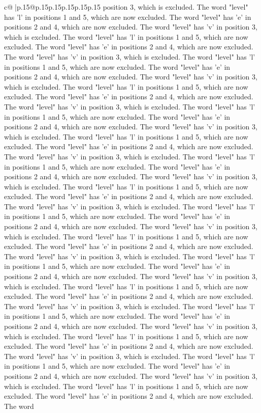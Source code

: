 \documentclass{article}
\begin{document}
{\begin{supertabular}{c@{$\;$}|p{.15\linewidth}@{}p{.15\linewidth}p{.15\linewidth}p{.15\linewidth}p{.15\linewidth}p{.15\linewidth}}
{{{position 3, which is excluded. The word "level" has 'l' in positions 1 and 5, which are now excluded. The word "level" has 'e' in positions 2 and 4, which are now excluded. The word "level" has 'v' in position 3, which is excluded. The word "level" has 'l' in positions 1 and 5, which are now excluded. The word "level" has 'e' in positions 2 and 4, which are now excluded. The word "level" has 'v' in position 3, which is excluded. The word "level" has 'l' in positions 1 and 5, which are now excluded. The word "level" has 'e' in positions 2 and 4, which are now excluded. The word "level" has 'v' in position 3, which is excluded. The word "level" has 'l' in positions 1 and 5, which are now excluded. The word "level" has 'e' in positions 2 and 4, which are now excluded. The word "level" has 'v' in position 3, which is excluded. The word "level" has 'l' in positions 1 and 5, which are now excluded. The word "level" has 'e' in positions 2 and 4, which are now excluded. The word "level" has 'v' in position 3, which is excluded. The word "level" has 'l' in positions 1 and 5, which are now excluded. The word "level" has 'e' in positions 2 and 4, which are now excluded. The word "level" has 'v' in position 3, which is excluded. The word "level" has 'l' in positions 1 and 5, which are now excluded. The word "level" has 'e' in positions 2 and 4, which are now excluded. The word "level" has 'v' in position 3, which is excluded. The word "level" has 'l' in positions 1 and 5, which are now excluded. The word "level" has 'e' in positions 2 and 4, which are now excluded. The word "level" has 'v' in position 3, which is excluded. The word "level" has 'l' in positions 1 and 5, which are now excluded. The word "level" has 'e' in positions 2 and 4, which are now excluded. The word "level" has 'v' in position 3, which is excluded. The word "level" has 'l' in positions 1 and 5, which are now excluded. The word "level" has 'e' in positions 2 and 4, which are now excluded. The word "level" has 'v' in position 3, which is excluded. The word "level" has 'l' in positions 1 and 5, which are now excluded. The word "level" has 'e' in positions 2 and 4, which are now excluded. The word "level" has 'v' in position 3, which is excluded. The word "level" has 'l' in positions 1 and 5, which are now excluded. The word "level" has 'e' in positions 2 and 4, which are now excluded. The word "level" has 'v' in position 3, which is excluded. The word "level" has 'l' in positions 1 and 5, which are now excluded. The word "level" has 'e' in positions 2 and 4, which are now excluded. The word "level" has 'v' in position 3, which is excluded. The word "level" has 'l' in positions 1 and 5, which are now excluded. The word "level" has 'e' in positions 2 and 4, which are now excluded. The word "level" has 'v' in position 3, which is excluded. The word "level" has 'l' in positions 1 and 5, which are now excluded. The word "level" has 'e' in positions 2 and 4, which are now excluded. The word "level" has 'v' in position 3, which is excluded. The word "level" has 'l' in positions 1 and 5, which are now excluded. The word "level" has 'e' in positions 2 and 4, which are now excluded. The word }}}
\end{supertabular}}
\end{document}
